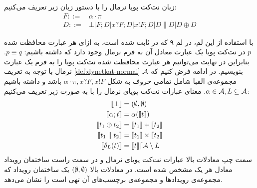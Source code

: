 \begin{definition}
    \label{def:dynetkat-normal}
    زبان نت‌کت پویا‌ نرمال را با دستور زبان زیر تعریف می‌کنیم:
    \begin{align*}
        F ::= & \alpha\cdot\pi                                          \\
        D ::= & \bot | F;D | x?F;D | x!F;D | D \parallel D | D \oplus D
    \end{align*}
\end{definition}
با استفاده از این لم، در لم ۹ که در
\cite{dynetkat}
ثابت شده است،
به ازای هر عبارت محافظت شده
$p$
در نت‌کت پویا یک عبارت معادل آن به فرم نرمال وجود دارد که داشته باشیم:
$p \equiv q$.
بنابراین در نهایت می‌توانیم هر عبارت محافظت شده نت‌کت پویا را به فرم یک عبارت نرمال
با توجه به تعریف
\ref{def:dynetkat-normal}
بنویسیم.
در ادامه فرض کنیم که
$\mathcal{A}$
مجموعه‌ی الفبا شامل تمامی حروف به شکل
$\alpha\cdot\pi,x?F,x!F$
باشد و داشته باشیم
$\alpha \in \mathcal{A}, L \subseteq \mathcal{A}$.
معنای عبارات نت‌کت پویای نرمال را با به صورت زیر تعریف می‌کنیم:
\begin{align*}
    \llbracket \bot \rrbracket              & = (\emptyset,\emptyset)                               \\
    \llbracket \alpha;t \rrbracket          & = \alpha(\llbracket t \rrbracket)                       \\
    \llbracket t_1 \oplus t_2 \rrbracket    & = \llbracket t_1 \rrbracket + \llbracket t_2 \rrbracket                 \\
    \llbracket t_1 \parallel t_2 \rrbracket & = \llbracket t_1 \rrbracket \times \llbracket t_2 \rrbracket            \\
    \llbracket \delta_{L}(t) \rrbracket     & = \llbracket t \rrbracket\lceil \mathcal{A} \setminus L
\end{align*}
سمت چپ معادلات بالا عبارات نت‌کت پویای نرمال و در سمت راست ساختمان رویداد معادل هر یک مشخص شده است.
در معادلات بالا
$(\emptyset,\emptyset)$
یک ساختمان رویداد که مجموعه‌ی رویداد‌ها و مجموعه‌ی برچسب‌های آن تهی است را نشان می‌دهد.